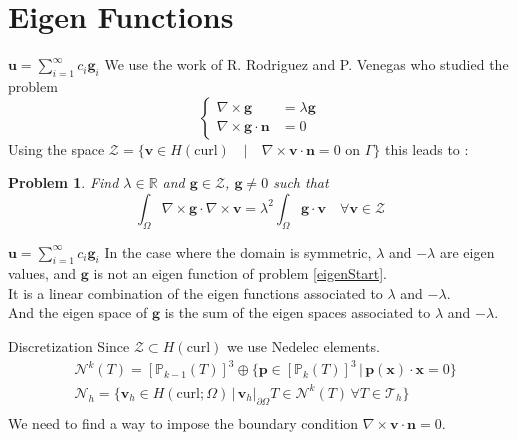 \documentclass{beamer}
\newtheorem{pb}{Problem}
\newcommand{\R}{{\mathbb{R}}}
\newcommand{\Z}{{\bm{\mathcal{Z}}}}
\newcommand{\PP}{{\mathbb{P}}}
\newcommand{\TT}{{\bm{\mathcal{T}}}}
\newcommand{\NN}{{\bm{\mathcal{N}}}}
\newcommand{\curl}{{\nabla\times}}
\newcommand{\restr}{{\big\rvert_{\partial\Omega}}}
\begin{document}
\section{Eigen Functions}
\begin{frame}{$\mathbf{u}=\sum_{i=1}^\infty c_i\mathbf{g}_i$}
  We use the work of R. Rodriguez and P. Venegas who studied the problem
  \begin{equation}\label{eigenStart}
    \left\{
    \begin{aligned}
      \curl\mathbf{g}&=\lambda\mathbf{g}\\
      \curl\mathbf{g}\cdot\mathbf{n}&=0
    \end{aligned}
    \right.
  \end{equation}
  Using the space $\Z=\{\mathbf{v}\in H(\mathrm{curl}) \quad|\quad \curl\mathbf{v}\cdot\mathbf{n} = 0 \mbox{ on } \Gamma\}$ this leads to :
  \begin{pb}\label{eigenwf}
    Find $\lambda\in\R$ and $\mathbf{g}\in \Z$, $\mathbf{g}\neq 0$ such that
    \[\int_\Omega \curl\mathbf{g}\cdot\curl\mathbf{v} = \lambda^2\int_\Omega \mathbf{g}\cdot\mathbf{v} \quad \forall\mathbf{v}\in \Z \]
    \end{pb}
\end{frame}

\begin{frame}{$\mathbf{u}=\sum_{i=1}^\infty c_i\mathbf{g}_i$}
  In the case where the domain is symmetric, $\lambda$ and $-\lambda$ are eigen values, and $\mathbf{g}$ is not an eigen function of problem \ref{eigenStart}.\\
  It is a linear combination of the eigen functions associated to $\lambda$ and $-\lambda$.\\
  And the eigen space of $\mathbf{g}$ is the sum of the eigen spaces associated to $\lambda$ and $-\lambda$.
  \begin{block}{Discretization}
    Since $\Z\subset H(\mathrm{curl})$ we use Nedelec elements.\\
    \begin{align*}
      &\NN^k(T)=[\PP_{k-1}(T)]^3\oplus\{\mathbf{p}\in[\PP_k(T)]^3 \,|\,
      \mathbf{p(x)}\cdot\mathbf{x}=0 \}\\
      &\NN_h=\{\mathbf{v}_h\in H(\mathrm{curl};\Omega) \,|\,
      \mathbf{v}_h\restr{T}\in\NN^k(T)\, \forall T\in \TT_h \}\\
    \end{align*}
    We need to find a way to impose the boundary condition $\curl\mathbf{v}\cdot\mathbf{n}=0$.
  \end{block}
\end{frame}
\end{document}
